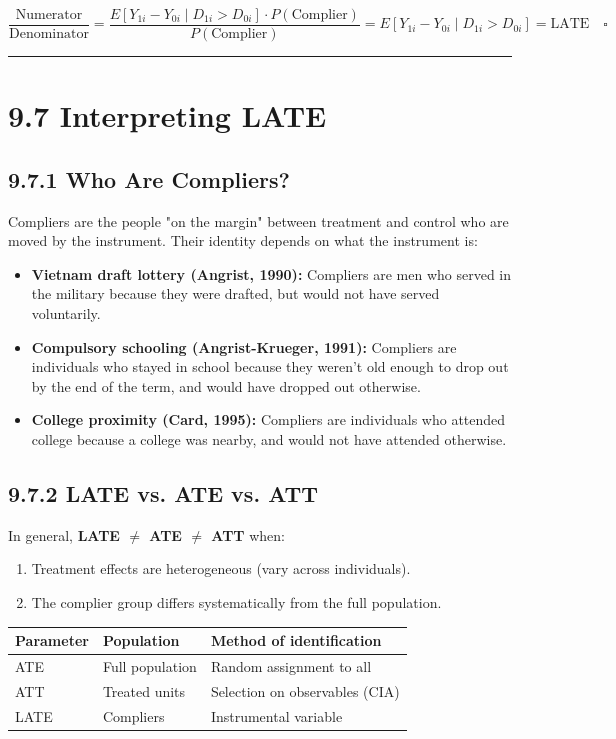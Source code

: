 \[
\frac{\text{Numerator}}{\text{Denominator}} = \frac{E[Y_{1i} - Y_{0i} \mid D_{1i} > D_{0i}] \cdot P(\text{Complier})}{P(\text{Complier})} = E[Y_{1i} - Y_{0i} \mid D_{1i} > D_{0i}] = \text{LATE} \quad \square
\]

\medskip\hrule\medskip

\section{9.7 Interpreting LATE}

\subsection{9.7.1 Who Are Compliers?}

Compliers are the people "on the margin" between treatment and control who are moved by the instrument. Their identity depends on what the instrument is:

\begin{itemize}
\item \textbf{Vietnam draft lottery (Angrist, 1990):} Compliers are men who served in the military because they were drafted, but would not have served voluntarily.
\item \textbf{Compulsory schooling (Angrist-Krueger, 1991):} Compliers are individuals who stayed in school because they weren't old enough to drop out by the end of the term, and would have dropped out otherwise.
\item \textbf{College proximity (Card, 1995):} Compliers are individuals who attended college because a college was nearby, and would not have attended otherwise.
\end{itemize}

\subsection{9.7.2 LATE vs. ATE vs. ATT}

In general, \textbf{LATE $\neq$ ATE $\neq$ ATT} when:

\begin{enumerate}
\item Treatment effects are heterogeneous (vary across individuals).
\item The complier group differs systematically from the full population.
\end{enumerate}

\begin{center}
\begin{tabular}{@{} l l l @{}}
\toprule
\textbf{Parameter} & \textbf{Population} & \textbf{Method of identification} \\
\midrule
ATE & Full population & Random assignment to all \\
ATT & Treated units & Selection on observables (CIA) \\
LATE & Compliers & Instrumental variable \\
\bottomrule
\end{tabular}
\end{center}

